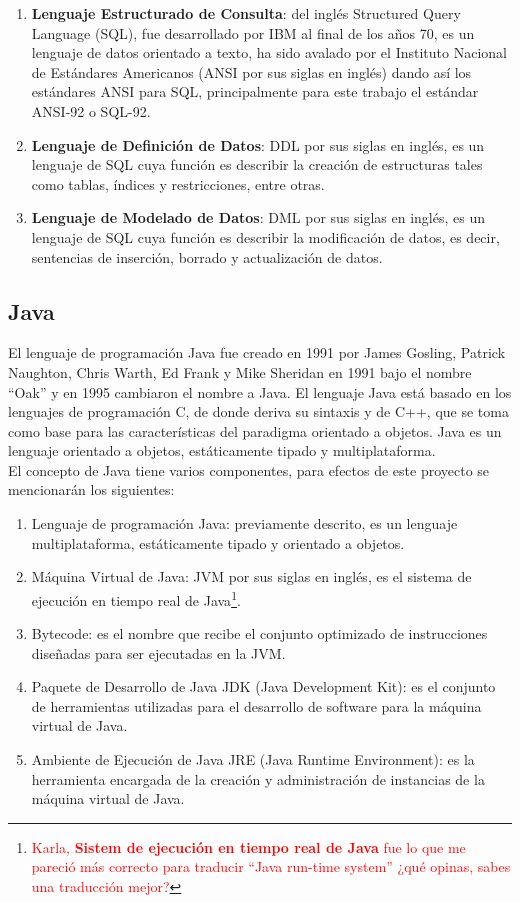 \begin{enumerate}
	\item \textbf{Lenguaje Estructurado de Consulta}\label{sec-sql}: del inglés Structured Query Language (SQL), fue desarrollado por IBM\textsuperscript{\textcopyright} al final de los años 70, es un lenguaje de datos orientado a texto, ha sido avalado por el Instituto Nacional de Estándares Americanos (ANSI por sus siglas en inglés) dando así los estándares ANSI para SQL, principalmente para este trabajo el estándar ANSI-92 o SQL-92.
	\item \textbf{Lenguaje de Definición de Datos}: DDL por sus siglas en inglés, es un lenguaje de SQL cuya función es describir la creación de estructuras tales como tablas, índices y restricciones, entre otras\cite{DataBaseConcepts}.
	\item \textbf{Lenguaje de Modelado de Datos}: DML por sus siglas en inglés, es un lenguaje de SQL cuya función es describir la modificación de datos, es decir, sentencias de inserción, borrado y actualización de datos\cite{DataBaseConcepts}.  
\end{enumerate}

\subsection{Java}\label{sec-java}

El lenguaje de programación Java fue creado en 1991 por James Gosling, Patrick Naughton, Chris Warth, Ed Frank y Mike Sheridan en 1991 bajo el nombre ``Oak'' y en 1995 cambiaron el nombre a Java. El lenguaje Java está basado en los lenguajes de programación C, de donde deriva su sintaxis y de C++, que se toma como base para las características del paradigma orientado a objetos. Java es un lenguaje orientado a objetos, estáticamente tipado y multiplataforma\cite{JavaCompleteReference, WellGroundedJavaDeveloper}.\\
El concepto de Java tiene varios componentes, para efectos de este proyecto se mencionarán los siguientes\cite{JavaCompleteReference, WellGroundedJavaDeveloper}:
\begin{enumerate}
	\item Lenguaje de programación Java: previamente descrito, es un lenguaje multiplataforma, estáticamente tipado y orientado a objetos.
	\item Máquina Virtual de Java: JVM por sus siglas en inglés, es el sistema de ejecución en tiempo real de Java\footnote{\textcolor{red}{Karla, \textbf{Sistem de ejecución en tiempo real de Java} fue lo que me pareció más correcto para traducir ``Java run-time system'' ¿qué opinas, sabes una traducción mejor?}}.
	\item Bytecode: es el nombre que recibe el conjunto optimizado de instrucciones diseñadas para ser ejecutadas en la JVM.
	\item Paquete de Desarrollo de Java JDK (Java Development Kit): es el conjunto de herramientas utilizadas para el desarrollo de software para la máquina virtual de Java.
	\item Ambiente de Ejecución de Java JRE (Java Runtime Environment): es la herramienta encargada de la creación y administración de instancias de la máquina virtual de Java.
\end{enumerate}

